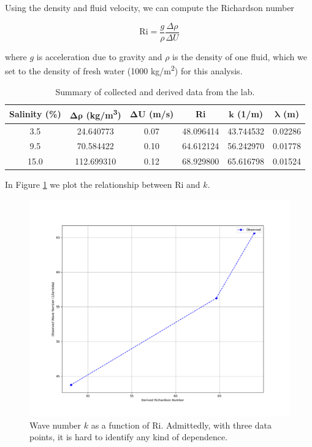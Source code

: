 \documentclass{article}
\begin{document}
Using the density and fluid velocity, we can compute the Richardson number

\[ \text{Ri} = \frac{g}{\rho} \frac{\Delta \rho}{\Delta U} \]

where \(g\) is acceleration due to gravity and \(\rho\) is the density of one fluid, which we set to the density of fresh water (1000 kg/m\textsuperscript{2}) for this analysis.

\begin{table}[h!]
    \centering
    \begin{tabular}{|c|c|c|c|c|c|}
    \hline
    \textbf{Salinity (\%)} & $\bm{\Delta \rho}$ \textbf{(kg/m\textsuperscript{3})} & $\bm{\Delta U}$ \textbf{(m/s)}& \textbf{Ri} & $\bm{k}$ \textbf{(1/m)}& $\bm{\lambda}$ \textbf{(m)}\\ \hline
    3.5 & 24.640773 & 0.07 & 48.096414 & 43.744532 & 0.02286 \\ \hline
    9.5 & 70.584422 & 0.10 & 64.612124 & 56.242970 & 0.01778 \\ \hline
    15.0 & 112.699310 & 0.12 & 68.929800 & 65.616798 & 0.01524 \\ \hline
    \end{tabular}
    \caption{Summary of collected and derived data from the lab.}
    \label{tab:data}
\end{table}

In Figure \ref{graph:Ri-vs-k} we plot the relationship between Ri and \(k\).

\begin{figure}[h!]
    \centering
    \includegraphics[width=5in]{RivsK.png}
    \caption{Wave number $k$ as a function of Ri. Admittedly, with three data points, it is hard to identify any kind of dependence.}
    \label{graph:Ri-vs-k}
\end{figure}
\end{document}
